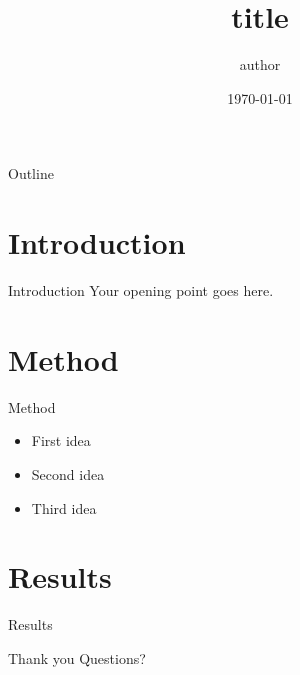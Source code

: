\documentclass{beamer}
\title{{{title}}}
\author{{{author}}}
\institute{{{institute}}}
\date{\today}
\begin{document}
\maketitle

\begin{frame}{Outline}
\tableofcontents
\end{frame}

\section{Introduction}

\begin{frame}{Introduction}
Your opening point goes here.
\end{frame}

\section{Method}

\begin{frame}{Method}
\begin{itemize}
  \item First idea
  \item Second idea
  \item Third idea
\end{itemize}
\end{frame}

\section{Results}

\begin{frame}{Results}
\end{frame}

\begin{frame}{Thank you}
Questions?
\end{frame}
\end{document}
